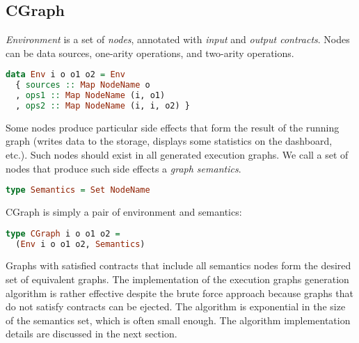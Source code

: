 \subsection{CGraph}

{\em Environment} is a set of {\em nodes}, annotated with {\em input} and {\em output contracts}.
Nodes can be data sources, one-arity operations, and two-arity operations.

\begin{lstlisting}[language=Haskell]
data Env i o o1 o2 = Env
  { sources :: Map NodeName o
  , ops1 :: Map NodeName (i, o1)
  , ops2 :: Map NodeName (i, i, o2) }
\end{lstlisting}

Some nodes produce particular side effects that form the result of the running graph (writes data to the storage, displays some statistics on the dashboard, etc.).
Such nodes should exist in all generated execution graphs.
We call a set of nodes that produce such side effects a {\em graph semantics}.

\begin{lstlisting}[language=Haskell]
type Semantics = Set NodeName
\end{lstlisting}

CGraph is simply a pair of environment and semantics:

\begin{lstlisting}[language=Haskell]
type CGraph i o o1 o2 = 
  (Env i o o1 o2, Semantics)
\end{lstlisting}

Graphs with satisfied contracts that include all semantics nodes form the desired set of equivalent graphs. 
The implementation of the execution graphs generation algorithm is rather effective despite the brute force approach because graphs that do not satisfy contracts can be ejected. 
The algorithm is exponential in the size of the semantics set, which is often small enough.
The algorithm implementation details are discussed in the next section.
